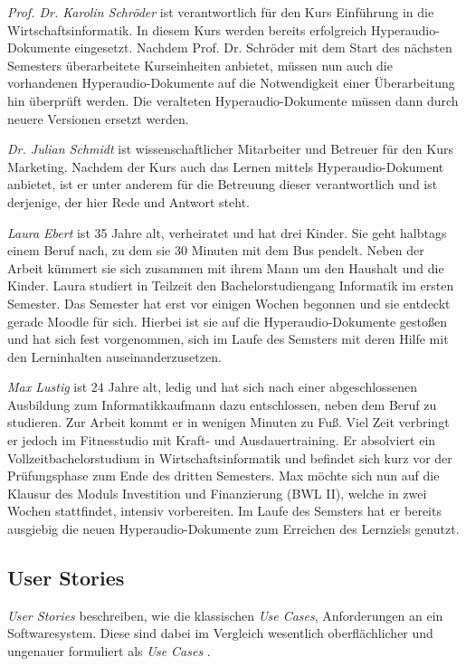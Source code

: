 {\Large\emph{Prof. Dr. Karolin Schröder}} ist verantwortlich für den Kurs \glqq Einführung in die Wirtschaftsinformatik\grqq{}. In diesem Kurs werden bereits erfolgreich Hyperaudio-Dokumente eingesetzt. Nachdem Prof. Dr. Schröder mit dem Start des nächsten Semesters überarbeitete Kurseinheiten anbietet, müssen nun auch die vorhandenen Hyperaudio-Dokumente auf die Notwendigkeit einer Überarbeitung hin überprüft werden. Die veralteten Hyperaudio-Dokumente müssen dann durch neuere Versionen ersetzt werden.
\vspace{.5cm}

{\Large\emph{Dr. Julian Schmidt}} ist wissenschaftlicher Mitarbeiter und Betreuer für den Kurs \glqq Marketing\grqq{}. Nachdem der Kurs auch das Lernen mittels Hyperaudio-Dokument anbietet, ist er unter anderem für die Betreuung dieser verantwortlich und ist derjenige, der hier Rede und Antwort steht.
\vspace{.5cm}

{\Large\emph{Laura Ebert}} ist 35 Jahre alt, verheiratet und hat drei Kinder. Sie geht halbtags einem Beruf nach, zu dem sie 30 Minuten mit dem Bus pendelt. Neben der Arbeit kümmert sie sich zusammen mit ihrem Mann um den Haushalt und die Kinder. Laura studiert in Teilzeit den Bachelorstudiengang Informatik im ersten Semester. Das Semester hat erst vor einigen Wochen begonnen und sie entdeckt gerade Moodle für sich. Hierbei ist sie auf die Hyperaudio-Dokumente gestoßen und hat sich fest vorgenommen, sich im Laufe des Semsters mit deren Hilfe mit den Lerninhalten auseinanderzusetzen.
\vspace{.5cm}
 
{\Large\emph{Max Lustig}} ist 24 Jahre alt, ledig und hat sich nach einer abgeschlossenen Ausbildung zum Informatikkaufmann dazu entschlossen, neben dem Beruf zu studieren. Zur Arbeit kommt er in wenigen Minuten zu Fuß. Viel Zeit verbringt er jedoch im Fitnesstudio mit Kraft- und Ausdauertraining. Er absolviert ein Vollzeitbachelorstudium in Wirtschaftsinformatik und befindet sich kurz vor der Prüfungsphase zum Ende des dritten Semesters. Max möchte sich nun auf die Klausur des Moduls \glqq Investition und Finanzierung (BWL II)\grqq{}, welche in zwei Wochen stattfindet, intensiv vorbereiten. Im Laufe des Semsters hat er bereits ausgiebig die neuen Hyperaudio-Dokumente zum Erreichen des Lernziels genutzt.

\par
\endgroup

\subsection{User Stories}
\textit{User Stories} beschreiben, wie die klassischen \textit{Use Cases}, Anforderungen an ein Softwaresystem. Diese sind dabei im Vergleich wesentlich oberflächlicher und ungenauer formuliert als \textit{Use Cases} \citep{wirdemann2017scrum}.

